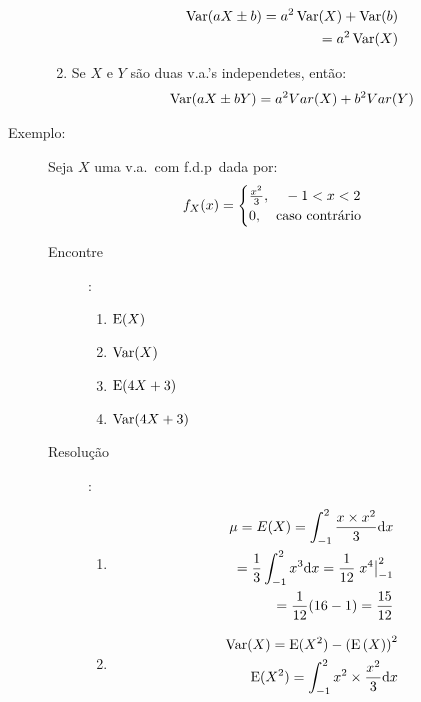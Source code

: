 \begin{description}
\begin{enumerate}[label=(\alph*)]
                \begin{align*}
                 \operatorname{Var}(aX\pm b)=a^2 \operatorname{Var}(X)+\operatorname{Var}(b)\\
               =a^2 \operatorname{Var}(X)
               \end{align*}
             \item Se $X$ e $Y$ são duas v.a.'s independetes, então: 
  \begin{align*}
                 \operatorname{Var}(aX \pm bY)=a^2 Var(X)+ b^2 Var(Y)
  \end{align*}
           \end{enumerate}
         \item [Exemplo:] Seja $X$ uma v.a.\ com f.d.p\ dada por: 
           \begin{align}
             f_{X}(x)=
             \begin{cases}
               \frac{x^2}{3}, \text{\quad} -1<x<2\\
               0, \text{\quad caso contrário}
             \end{cases}
           \end{align}
           \begin{description}
             \item [Encontre]:
           \begin{enumerate}[label=(\alph*)]
             \item $\operatorname{E}(X)$
             \item $\operatorname{Var}(X)$
             \item $\operatorname{E}(4X+3)$
             \item $\operatorname{Var}(4X+3)$
           \end{enumerate}
         \item [Resolução]:
           \begin{enumerate}[label=(\alph*)]
             \item 
               \begin{align*}
                 \mu= E(X)=  \int_{-1}^{2}\frac{x\times x^2}{3}\mathrm{d}x\\
                 =\frac{1}{3}\int_{-1}^{2}x^3\mathrm{d}x=\frac{1}{12} \left.x^4\right\rvert_{-1}^{2}\\
                 =\frac{1}{12}(16-1)=\frac{15}{12}
               \end{align*}
             \item 
               \begin{align*}
                 \Var(X)=\E(X^2)-\left(\E\left(X\right)\right)^2\\
                 \E(X^2)=\int_{-1}^{2} x^2 \times \frac{x^2}{3}\mathrm{d}x

\end{align*}
\end{enumerate}
\end{description}
\end{description}
